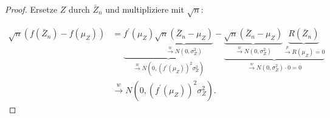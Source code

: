 \documentclass{tstextbook}
\begin{document}
\begin{proof}
	Ersetze $ Z $ durch $ \bar{Z}_n $ und multipliziere mit $ \sqrt{n} $: 
	
	\[
	\begin{aligned}
		\sqrt{n} \left(f(\bar{Z}_n)-f(\mu_Z)\right) & = \underbrace{f^\prime(\mu_Z)\underbrace{\sqrt{n}\left(\bar{Z}_n-\mu_Z\right)}_{\xrightarrow{w}N(0,\sigma_Z^2)}}_{\xrightarrow{w}N\left(0,(f^\prime(\mu_Z))^2\sigma_Z^2\right)} - \underbrace{\underbrace{\sqrt{n}(\bar{Z}_n-\mu_Z)}_{\xrightarrow{w}N(0,\sigma_Z^2)}\underbrace{R(\bar{Z}_n)}_{\xrightarrow{p}R(\mu_Z)=0}}_{\xrightarrow{w}N(0,\sigma_Z^2)\cdot 0 = 0} \\
		&  \xrightarrow{w} N\left(0, (f^\prime(\mu_Z))^2\sigma_Z^2\right).
	\end{aligned}
	\]
	
\end{proof}
\end{document}
